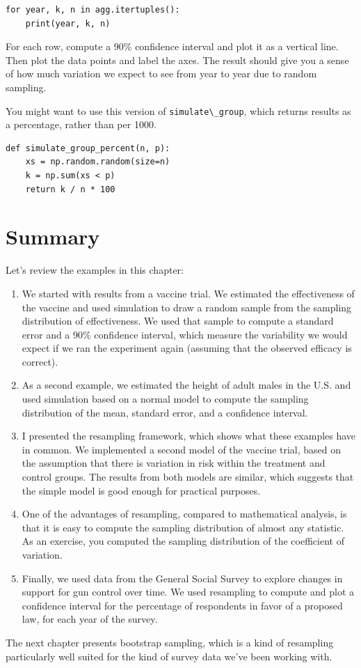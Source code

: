 \begin{lstlisting}
for year, k, n in agg.itertuples():
    print(year, k, n)
\end{lstlisting}

For each row, compute a 90\% confidence interval and plot it as a
vertical line. Then plot the data points and label the axes. The result
should give you a sense of how much variation we expect to see from year
to year due to random sampling.

You might want to use this version of
\passthrough{\lstinline!simulate\_group!}, which returns results as a
percentage, rather than per 1000.

\begin{lstlisting}[]
def simulate_group_percent(n, p):
    xs = np.random.random(size=n)
    k = np.sum(xs < p)
    return k / n * 100
\end{lstlisting}

\hypertarget{summary}{%
\section{Summary}\label{summary}}

Let's review the examples in this chapter:

\begin{enumerate}
\def\labelenumi{\arabic{enumi}.}
\item
  We started with results from a vaccine trial. We estimated the
  effectiveness of the vaccine and used simulation to draw a random
  sample from the sampling distribution of effectiveness. We used that
  sample to compute a standard error and a 90\% confidence interval,
  which measure the variability we would expect if we ran the experiment
  again (assuming that the observed efficacy is correct).
\item
  As a second example, we estimated the height of adult males in the
  U.S. and used simulation based on a normal model to compute the
  sampling distribution of the mean, standard error, and a confidence
  interval.
\item
  I presented the resampling framework, which shows what these examples
  have in common. We implemented a second model of the vaccine trial,
  based on the assumption that there is variation in risk within the
  treatment and control groups. The results from both models are
  similar, which suggests that the simple model is good enough for
  practical purposes.
\item
  One of the advantages of resampling, compared to mathematical
  analysis, is that it is easy to compute the sampling distribution of
  almost any statistic. As an exercise, you computed the sampling
  distribution of the coefficient of variation.
\item
  Finally, we used data from the General Social Survey to explore
  changes in support for gun control over time. We used resampling to
  compute and plot a confidence interval for the percentage of
  respondents in favor of a proposed law, for each year of the survey.
\end{enumerate}

The next chapter presents bootstrap sampling, which is a kind of
resampling particularly well suited for the kind of survey data we've
been working with.


